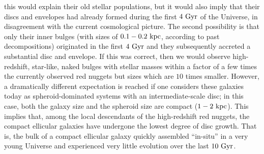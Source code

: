 \documentclass[useAMS,usenatbib,article]{mn2e}
\begin{document}
this would explain their old stellar populations, 
but it would also imply that their discs and envelopes had already formed during the first $4~\rm Gyr$ of the Universe, 
in disagreement with the current cosmological picture. 
The second possibility is that only their inner bulges (with sizes of $0.1-0.2~\rm kpc$, 
according to past decompositions) originated in the first $4~\rm Gyr$ 
and they subsequently accreted a substantial disc and envelope. 
If this was correct, then we would observe high-redshift, star-like, naked bulges with stellar masses 
within a factor of a few times the currently observed red nuggets but sizes which are $10$ times smaller. 
However, a dramatically different expectation is reached 
if one considers these galaxies today as spheroid-dominated systems with an intermediate-scale disc; 
in this case, both the galaxy size and the spheroid size are compact ($1-2~\rm kpc$). 
This implies that, among the local descendants of the high-redshift red nuggets, 
the compact ellicular galaxies have undergone the lowest degree of disc growth. 
That is, the bulk of a compact ellicular galaxy quickly assembled ``in-situ'' in a very young Universe 
and experienced very little evolution over the last $10~\rm Gyr$.
\end{document}
